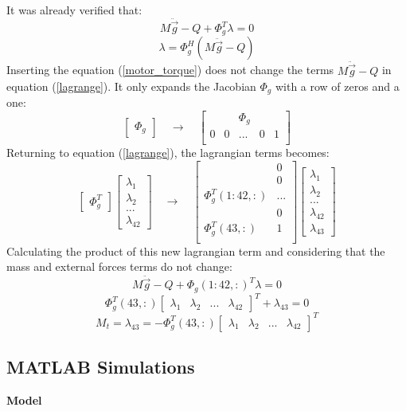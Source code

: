 It was already verified that: \[M\ddot{\vec{g}}-Q+\Phi_{g}^{T}\lambda=0\] \[\lambda=\Phi_{g}^{H}(M\ddot{\vec{g}}-Q)\] Inserting the equation (\ref{motor_torque}) does not change the terms $M\ddot{\vec{g}}-Q$ in equation (\ref{lagrange}). It only expands the Jacobian $\Phi_{g}$ with a row of zeros and a one:\[\begin{bmatrix}\Phi_{g}\end{bmatrix} \quad\rightarrow\quad \left[\begin{array}{ccccc}
& & \Phi_{g} &  & \\ \hline
0 & 0 & ... & 0 & 1 \\
\end{array}	\right]\]
Returning to equation (\ref{lagrange}), the lagrangian terms becomes: \[\begin{bmatrix}
\Phi_{g}^{T} \end{bmatrix}\begin{bmatrix}\lambda_{1}\\ \lambda_{2} \\ ... \\  \lambda_{42}  \end{bmatrix}\quad\rightarrow\quad \left[\begin{array}{c|c} & 0 \\ & 0 \\ \Phi_{g}^{T}(1:42,:) & ... \\ & 0 \\ \hline \Phi_{g}^{T}(43,:) & 1 \\ \end{array}	\right]\begin{bmatrix}\lambda_{1}\\ \lambda_{2} \\ ... \\  \lambda_{42} \\ \lambda_{43} \end{bmatrix}\] Calculating the product of this new lagrangian term and considering that the mass and external forces terms do not change: 
\[M\ddot{\vec{g}}-Q+\Phi_{g}(1:42,:)^{T}\lambda=0\] \[\Phi_{g}^{T}(43,:)  \begin{bmatrix}
\lambda_{1} & \lambda_{2} & ... &  \lambda_{42} \end{bmatrix}^{T} + \lambda_{43}=0\] \[M_{t}=\lambda_{43}=-\Phi_{g}^{T}(43,:) \begin{bmatrix} \lambda_{1} & \lambda_{2} & ... &  \lambda_{42} \end{bmatrix}^{T}\]

\newpage
\subsection{MATLAB Simulations}
\textbf{Model}


